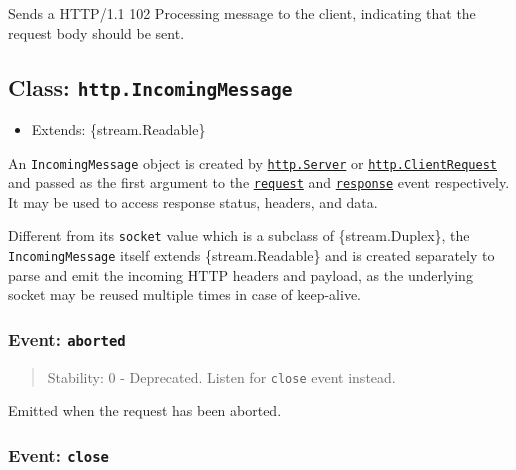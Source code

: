 Sends a HTTP/1.1 102 Processing message to the client, indicating that
the request body should be sent.

\subsection{\texorpdfstring{Class:
\texttt{http.IncomingMessage}}{Class: http.IncomingMessage}}\label{class-http.incomingmessage}

\begin{itemize}
\tightlist
\item
  Extends: \{stream.Readable\}
\end{itemize}

An \texttt{IncomingMessage} object is created by
\hyperref[class-httpserver]{\texttt{http.Server}} or
\hyperref[class-httpclientrequest]{\texttt{http.ClientRequest}} and
passed as the first argument to the
\hyperref[event-request]{\texttt{\textquotesingle{}request\textquotesingle{}}}
and
\hyperref[event-response]{\texttt{\textquotesingle{}response\textquotesingle{}}}
event respectively. It may be used to access response status, headers,
and data.

Different from its \texttt{socket} value which is a subclass of
\{stream.Duplex\}, the \texttt{IncomingMessage} itself extends
\{stream.Readable\} and is created separately to parse and emit the
incoming HTTP headers and payload, as the underlying socket may be
reused multiple times in case of keep-alive.

\subsubsection{\texorpdfstring{Event:
\texttt{\textquotesingle{}aborted\textquotesingle{}}}{Event: \textquotesingle aborted\textquotesingle{}}}\label{event-aborted}

\begin{quote}
Stability: 0 - Deprecated. Listen for
\texttt{\textquotesingle{}close\textquotesingle{}} event instead.
\end{quote}

Emitted when the request has been aborted.

\subsubsection{\texorpdfstring{Event:
\texttt{\textquotesingle{}close\textquotesingle{}}}{Event: \textquotesingle close\textquotesingle{}}}\label{event-close-3}

